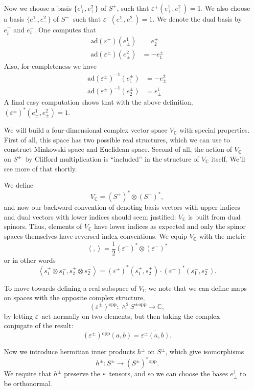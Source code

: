 \documentclass[twoside]{amsart}
\newcommand{\CC}{\ensuremath{\mathbb{C}}}
\renewcommand{\epsilon}{\varepsilon}
\newcommand{\enm}[1]{\ensuremath{#1}}
\newcommand{\ip}[2]{\enm{\left<#1,#2\right>}}
\newcommand{\ad}{\enm{\mathrm{ad}}}
\newcommand{\spl}{\enm{S^{+}}}
\newcommand{\sm}{\enm{S^{-}}}
\newcommand{\spm}{\enm{S^{\pm}}}
\newcommand{\spd}{\enm{(\spl)^{*}}}
\newcommand{\smd}{\enm{(\sm)^{*}}}
\newcommand{\eps}{\enm{\epsilon}}
\newcommand{\eij}[2]{\enm{e^{#1}_{#2}}}
\newcommand{\ei}[1]{\enm{e^{#1}_{+}}}
\newcommand{\eib}[1]{\enm{e^{#1}_{-}}}
\newcommand{\eil}[1]{\enm{e_{#1}^{+}}}
\newcommand{\eilb}[1]{\enm{e_{#1}^{-}}}
\newcommand{\eipm}[1]{\eij{#1}{\pm}}
\newcommand{\eilpm}[1]{\eij{\pm}{#1}}
\renewcommand{\epsilon}{\varepsilon}
\newcommand{\opp}[1]{\enm{{#1}{}^{\mathrm{opp}}}}
\begin{document}
Now we choose a basis \( \{\ei{1}, \ei{2}\} \) of \spl, such that \(
\eps^{+}(\ei{1}, \ei{2}) = 1.  \) We also choose a basis
\( \{\eib{1}, \eib{2}\} \) of \sm\ such that \( \eps^{-}(\eib{1},
\eib{2}) = 1.  \) We denote the dual basis by \( \eil{i} \) and \(
\eilb{i} \). One computes that
\begin{align}
    \ad(\eps^{\pm})(\eipm{1}) &= \eilpm{2}\label{eq:epslower} \\
    \ad(\eps^{\pm})(\eipm{2}) &= -\eilpm{1}\label{eq:epslower2}
\end{align}
Also, for completeness we have
\begin{align}
    \ad(\eps^{\pm})^{-1}(\eilpm{1}) &= -\eipm{2}\label{eq:epsraise} \\
    \ad(\eps^{\pm})^{-1}(\eilpm{2}) &= \eipm{1}\label{eq:epsraise2}
\end{align}
A final easy computation shows that with the above definition,
\( (\eps^{\pm})^{*}(e^{1}_{\pm}, e^{2}_{\pm}) = 1. \)

We will build a four-dimensional complex vector space \( V_{\CC} \)
with special properties.  First of all, this space has two possible
real structures, which we can use to construct Minkowski space and
Euclidean space.  Second of all, the action of \( V_{\CC} \) on \spm\
by Clifford multiplication is ``included'' in the structure of \(
V_{\CC} \) itself.  We'll see more of that shortly.

We define
\[ V_{\CC} = \spd\otimes\smd, \]
and now our backward convention of denoting basis vectors with upper
indices and dual vectors with lower indices should seem justified: \(
V_{\CC} \) is built from dual spinors.  Thus, elements of \( V_{\CC}
\)
have lower indices as expected and only the spinor spaces themselves
have reversed index conventions.  We equip \( V_{\CC} \) with the
metric
\[ \ip{}{} = \frac{1}{2}(\eps^{+})^{*}\otimes(\eps^{-})^{*} \]
or in other words
\[ \ip{s_{1}^{+}\otimes s_{1}^{-}}{s_{2}^{+}\otimes s_{2}^{-}} =
(\eps^{+})^{*}(s_{1}^{+}, s_{2}^{+})\cdot
(\eps^{-})^{*}(s_{1}^{-}, s_{2}^{-}). \]

To move towards defining a real subspace of \( V_{\CC} \) we note
that
we can define maps on spaces with the opposite complex structure,
\[ \opp{(\eps^{\pm})}:\opp{\wedge^{2}\spm}\to \CC, \]
by letting \eps\ act normally on two elements, but then taking the
complex conjugate of the result:
\[ \opp{(\eps^{\pm})}(a, b) = \overline{\eps^{\pm}(a, b)}. \]

Now we introduce hermitian inner products \( h^{\pm} \) on \spm, which
give isomorphisms
\[ h^{\pm}: \spm\to \opp{(\spm)^{*}}. \]
We require that \( h^{\pm} \) preserve the \eps\ tensors, and so we
can choose the bases \( e^{i}_{\pm} \) to be orthonormal.
\end{document}
